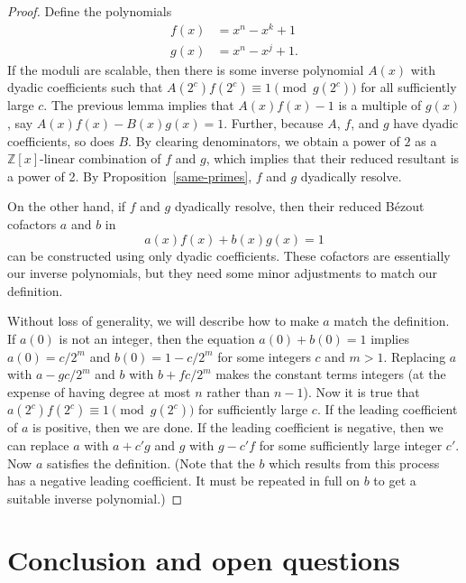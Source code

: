 \documentclass[]{article}
\theoremstyle{definition}
\begin{document}
\begin{proof}
    Define the polynomials
    \begin{align*}
        f(x) &= x^n - x^k + 1 \\
        g(x) &= x^n - x^j + 1.
    \end{align*}
    If the moduli are scalable, then there is some inverse
    polynomial $A(x)$ with dyadic coefficients such that $A(2^c) f(2^c) \equiv
    1 \pmod{g(2^c)}$ for all sufficiently large $c$. The previous lemma implies
    that $A(x) f(x) - 1$ is a multiple of $g(x)$, say $A(x) f(x) - B(x) g(x) =
    1$. Further, because $A$, $f$, and $g$ have dyadic coefficients, so does
    $B$. By clearing denominators, we obtain a power of $2$ as a
    $\mathbb{Z}[x]$-linear combination of $f$ and $g$, which implies that their
    reduced resultant is a power of 2. By Proposition~\ref{same-primes}, $f$
    and $g$ dyadically resolve.

    On the other hand, if $f$ and $g$ dyadically resolve, then their reduced
    B\'ezout cofactors $a$ and $b$ in
    \begin{equation*}
        a(x) f(x) + b(x) g(x) = 1
    \end{equation*}
    can be constructed using only dyadic coefficients. These cofactors are
    essentially our inverse polynomials, but they need some minor adjustments to
    match our definition.

    Without loss of generality, we will describe how to make $a$ match the
    definition. If $a(0)$ is not an integer, then the equation $a(0) + b(0) = 1$
    implies $a(0) = c/2^m$ and $b(0) = 1 - c/2^m$ for some integers $c$ and $m >
    1$. Replacing $a$ with $a - gc / 2^m$ and $b$ with $b + fc / 2^m$ makes the
    constant terms integers (at the expense of having degree at most $n$ rather
    than $n - 1$). Now it is true that $a(2^c) f(2^c) \equiv 1 \pmod{g(2^c)}$
    for sufficiently large $c$. If the leading coefficient of $a$ is positive,
    then we are done. If the leading coefficient is negative, then we can
    replace $a$ with $a + c' g$ and $g$ with $g - c' f$ for some sufficiently
    large integer $c'$. Now $a$ satisfies the definition. (Note that the $b$
    which results from this process has a negative leading coefficient. It must
    be repeated in full on $b$ to get a suitable inverse polynomial.)
\end{proof}

\section{Conclusion and open questions}
\end{document}
